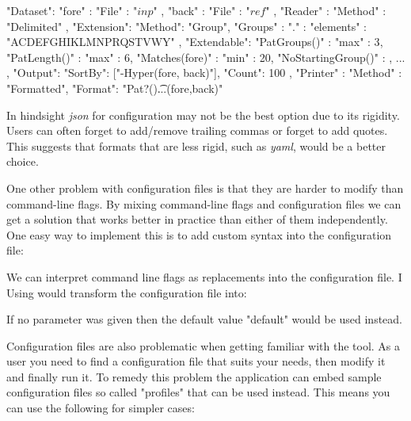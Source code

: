 \begin{file}
{
    "Dataset": {
        "fore" : { "File" : "$inp$" },
        "back" : { "File" : "$ref$" }
    },
    "Reader" : {
        "Method" : "Delimited"
    },
    "Extension": {
        "Method": "Group",
        "Groups" : {
            "." : { "elements" : "ACDEFGHIKLMNPRQSTVWY"}
        },
        "Extendable": {
            "PatGroups()" : {"max" : 3},
            "PatLength()" : {"max" : 6},
            "Matches(fore)" : {"min" : 20},
            "NoStartingGroup()" : {}
        },
        ...
    },
    "Output": {
        "SortBy": ["-Hyper(fore, back)"],
        "Count": 100
    },
    "Printer" : {
        "Method" : "Formatted",
        "Format": "Pat?()\t...\tHyper(fore,back)\n"
    }
}
\end{file}

In hindsight \emph{json} for configuration may not be the best option due to its rigidity. Users can often forget to add/remove trailing commas or forget to add quotes. This suggests that formats that are less rigid, such as \emph{yaml}\cite{yaml}, would be a better choice.

One other problem with configuration files is that they are harder to modify than command-line flags. By mixing command-line flags and configuration files we can get a solution that works better in practice than either of them independently. One easy way to implement this is to add custom syntax into the configuration file:

\begin{file}
"Datasets" : {
    "fore" : { "File" : "$argument:default$"
    ...
\end{file}

We can interpret command line flags as replacements into the configuration file. I Using  would transform the configuration file into:

\begin{file}
"Datasets" : {
    "fore" : { "File" : "other"
    ...
\end{file}

If no parameter was given then the default value "default" would be used instead.

Configuration files are also problematic when getting familiar with the tool. As a user you need to find a configuration file that suits your needs, then modify it and finally run it. To remedy this problem the application can embed sample configuration files so called "profiles" that can be used instead. This means you can use the following for simpler cases: 

